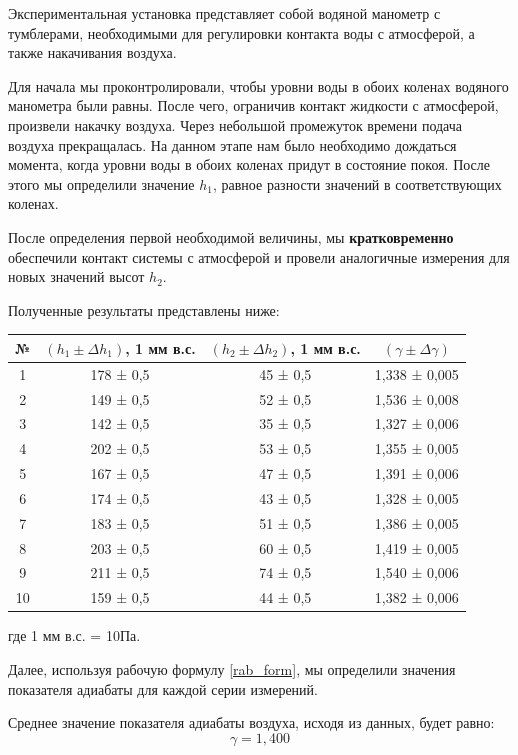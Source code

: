 \documentclass[a4paper,12pt]{article}
\begin{document}
Экспериментальная установка представляет собой водяной манометр с тумблерами, необходимыми для регулировки контакта воды с атмосферой, а также накачивания воздуха.

Для начала мы проконтролировали, чтобы уровни воды в обоих коленах водяного манометра были равны. После чего, ограничив контакт жидкости с атмосферой, произвели накачку воздуха. Через небольшой промежуток времени подача воздуха прекращалась. На данном этапе нам было необходимо дождаться момента, когда уровни воды в обоих коленах придут в состояние покоя. После этого мы определили значение $h_1$, равное разности значений в соответствующих коленах.

После определения первой необходимой величины, мы \textbf{кратковременно} обеспечили контакт системы с атмосферой и провели аналогичные измерения для новых значений высот $h_2$.

Полученные результаты представлены ниже:
\begin{center}
	\begin{tabular}{|c|c|c|c|}
		\hline
		№&$(h_1 \pm \Delta h_1)$, 1 мм в.с.&$(h_2 \pm \Delta h_2)$, 1 мм в.с.&$(\gamma \pm \Delta\gamma)$
		\\ 
		\hline
		1	&178 ± 0,5	&45 ± 0,5		&1,338 ± 0,005
		\\
		\hline
		2	&149 ± 0,5	&52 ± 0,5		&1,536 ± 0,008
		\\
		\hline
		3	&142 ± 0,5	&35 ± 0,5		&1,327 ± 0,006
		\\
		\hline
		4	&202 ± 0,5	&53 ± 0,5		&1,355 ± 0,005
		\\
		\hline
		5	&167 ± 0,5	&47 ± 0,5		&1,391 ± 0,006
		\\
		\hline
		6	&174 ± 0,5	&43 ± 0,5		&1,328 ± 0,005
		\\
		\hline
		7	&183 ± 0,5	&51 ± 0,5		&1,386 ± 0,005
		\\
		\hline
		8	&203 ± 0,5	&60 ± 0,5		&1,419 ± 0,005
		\\
		\hline
		9	&211 ± 0,5	&74 ± 0,5		&1,540 ± 0,006
		\\
		\hline
		10	&159 ± 0,5	&44 ± 0,5		&1,382 ± 0,006
		\\
		\hline
	\end{tabular}
\end{center}
где 1 мм в.с. = 10Па.

Далее, используя рабочую формулу \eqref{rab_form}, мы определили значения показателя адиабаты для каждой серии измерений.

Среднее значение показателя адиабаты воздуха, исходя из данных, будет равно:
$$\gamma = 1,400$$
\end{document}
